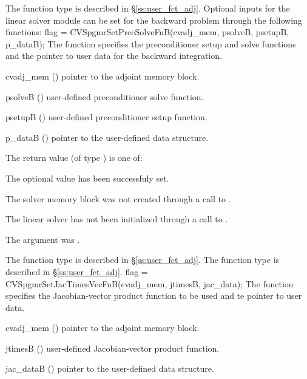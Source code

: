 {
  The function type  is described in \S\ref{ss:user_fct_adj}.
}
Optional inputs for the {\cvspgmr} linear solver module can be set for the backward
problem through the following functions:
{
  flag = CVSpgmrSetPrecSolveFnB(cvadj\_mem, psolveB, psetupB, p\_dataB);
}
{
  The function  specifies the preconditioner
  setup and solve functions and the pointer to user data for the backward integration.
}
{
  \begin{args}
  \item[cvadj\_mem] ()
    pointer to the adjoint memory block.
  \item[psolveB] ()
    user-defined preconditioner solve function.
  \item[psetupB] ()
    user-defined preconditioner setup function.
  \item[p\_dataB] ()
     pointer to the user-defined data structure.
  \end{args}
}
{
  The return value  (of type ) is one of:
  \begin{args}
  \item[\Id{CVSPGMR\_SUCCESS}] 
    The optional value has been successfuly set.
  \item[\Id{CVSPGMR\_MEM\_NULL}]
    The {\cvodes} solver memory block was not created through a call to .
  \item[\Id{CVSPGMR\_LMEM\_NULL}]
    The {\cvspgmr} linear solver has not been initialized through a call to .
  \item[\Id{CV\_ADJMEM\_NULL}]
    The  argument was .
  \end{args}
}
{
   The function type  is described in \S\ref{ss:user_fct_adj}.
   The function type  is described in \S\ref{ss:user_fct_adj}.
}
{
  flag = CVSpgmrSetJacTimesVecFnB(cvadj\_mem, jtimesB, jac\_data);
}
{
  The function  specifies the Jacobian-vector 
  product function to be used and te pointer to user data.
}
{
  \begin{args}
  \item[cvadj\_mem] ()
    pointer to the adjoint memory block.
  \item[jtimesB] ()
    user-defined Jacobian-vector product function.
  \item[jac\_dataB] ()
    pointer to the user-defined data structure.
  \end{args}
}
